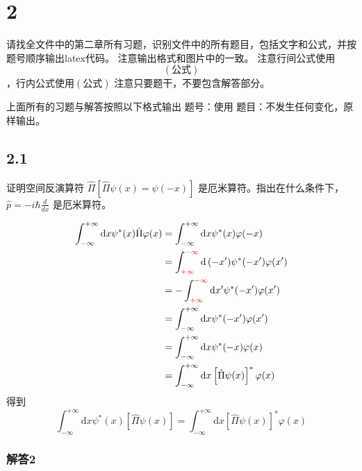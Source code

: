 \section{2}
请找全文件中的第二章所有习题，识别文件中的所有题目，包括文字和公式，并按题号顺序输出latex代码。
注意输出格式和图片中的一致。
注意行间公式使用$$(公式)$$，行内公式使用$(公式)$
注意只要题干，不要包含解答部分。

上面所有的习题与解答按照以下格式输出
题号：使用%
题目：不发生任何变化，原样输出。

\subsection{2.1}
证明空间反演算符 $\hat{\Pi}[\hat{\Pi}\psi(x)=\psi(-x)]$ 是厄米算符。指出在什么条件下，$\hat{p}=-i\hbar\frac{d}{dx}$ 是厄米算符。

\begin{equation}
    \begin{aligned}
        \int_{-\infty}^{+\infty}{\mathrm{d}x}\psi ^*(x)\hat{\Pi}\varphi (x)&=\int_{-\infty}^{+\infty}{\mathrm{d}x}\psi ^*(x)\varphi (-x)
\\
&=\int_{{\color[RGB]{240, 0, 0} +\infty }}^{{\color[RGB]{240, 0, 0} -\infty }}{\mathrm{d}\left( -x^{\prime} \right)}\psi ^*(-x^{\prime})\varphi (x^{\prime})
\\
&=-\int_{{\color[RGB]{240, 0, 0} +\infty }}^{{\color[RGB]{240, 0, 0} -\infty }}{\mathrm{d}x^{\prime}}\psi ^*(-x^{\prime})\varphi (x^{\prime})
\\
&=\int_{-\infty}^{+\infty}{\mathrm{d}x}\psi ^*(-x^{\prime})\varphi (x^{\prime})
\\
&=\int_{-\infty}^{+\infty}{\mathrm{d}x}\psi ^*(-x)\varphi (x)
\\
&=\int_{-\infty}^{+\infty}{\mathrm{d}x}\left[ \hat{\Pi}\psi (x) \right] ^*\varphi (x)
    \end{aligned}
\end{equation}
得到
\begin{equation}
    \int_{-\infty}^{+\infty}{\mathrm{d}x}\psi ^*(x)\left[ \hat{\Pi}\psi (x) \right] =\int_{-\infty}^{+\infty}{\mathrm{d}x}\left[ \hat{\Pi}\psi (x) \right] ^*\varphi (x)
\end{equation}

\subsubsection{解答2}

